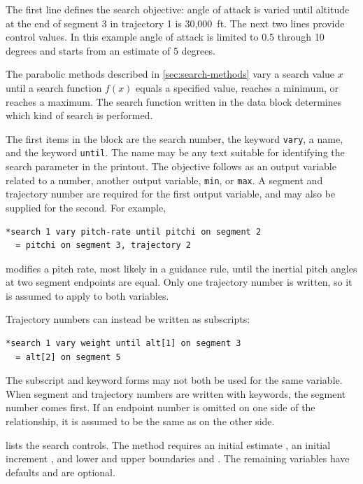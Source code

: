 The first line defines the search objective: angle of attack is varied until altitude at
the end of segment 3 in trajectory 1 is 30,000~ft. The next two lines provide control
values. In this example angle of attack is limited to 0.5 through 10 degrees and starts
from an estimate of 5 degrees.

The parabolic methods described in \cref{sec:search-methods} vary a search value
$x$ until a search function $f(x)$ equals a specified value, reaches a minimum, or
reaches a maximum. The search function written in the data block determines which
kind of search is performed.

The first items in the block are the search number, the keyword \texttt{vary}, a name,
and the keyword \texttt{until}. The name may be any text suitable for identifying the
search parameter in the printout. The objective follows as an output variable related
to a number, another output variable, \texttt{min}, or \texttt{max}. A segment and
trajectory number are required for the first output variable, and may also be supplied
for the second. For example,

\begin{lstlisting}[style=taosmanual]
*search 1 vary pitch-rate until pitchi on segment 2
  = pitchi on segment 3, trajectory 2
\end{lstlisting}

modifies a pitch rate, most likely in a guidance rule, until the inertial pitch angles at
two segment endpoints are equal. Only one trajectory number is written, so it is
assumed to apply to both variables.

Trajectory numbers can instead be written as subscripts:

\begin{lstlisting}[style=taosmanual]
*search 1 vary weight until alt[1] on segment 3
  = alt[2] on segment 5
\end{lstlisting}

The subscript and keyword forms may not both be used for the same variable. When
segment and trajectory numbers are written with keywords, the segment number
comes first. If an endpoint number is omitted on one side of the relationship, it is
assumed to be the same as on the other side.


 lists the search controls. The method requires an
initial estimate , an initial increment , and lower and upper
boundaries  and . The remaining variables have defaults
and are optional.

